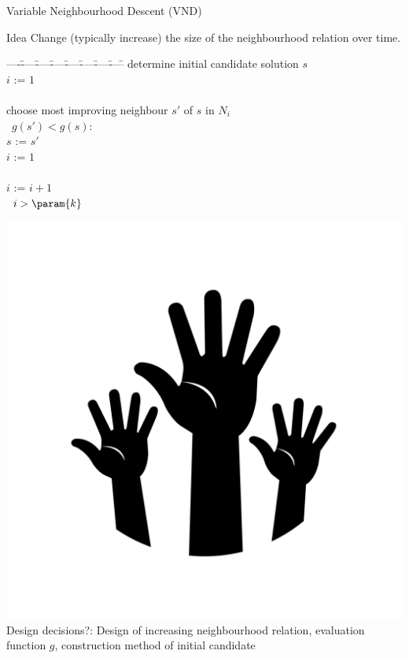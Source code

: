 \begin{frame}[c]{Variable Neighbourhood Descent (VND)}

\begin{block}{Idea}
Change (typically increase) the size of the neighbourhood relation over time. 
\end{block}

\begin{tabbing}
----\=----\=----\=----\=----\=----\=----\=----\=\kill
\> determine initial candidate solution $s$\\
\> $i$ := $1$\\
\> \pscRepeat\\
\> \vbar \> choose most improving neighbour $s'$ of $s$ in $N_i$\\[-0.55ex]
\> \vbar \> \pscIf\ $g(s') < g(s)$:\\[-0.55ex]
\> \vbar \> \> $s$ := $s'$\\[-0.55ex]
\> \vbar \> \> $i$ := $1$\\[-0.55ex]
\> \vbar \> \pscElse\ \\[-0.55ex]
\> \vendbar \> \> $i$ := $i+1$\\[-0.55ex]
\> \pscUntil\ $i > \param{k}$
\end{tabbing}

\pause

\vspace{-0.5cm}
\includegraphics[scale=.03]{images/hands.png}
\alert{Design decisions?}:
\pause Design of increasing neighbourhood relation, evaluation function $g$,
construction method of initial candidate

\end{frame}

